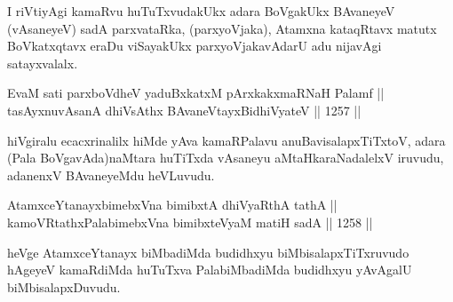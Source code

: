 \begin{artha}
I riVtiyAgi kamaRvu huTuTxvudakUkx adara BoVgakUkx BAvaneyeV (vAsaneyeV) sadA parxvataRka, (parxyoVjaka), Atamxna kataqRtavx matutx BoVkatxqtavx eraDu viSayakUkx parxyoVjakavAdarU adu nijavAgi satayxvalalx.
\end{artha}


\begin{shl}
EvaM sati parxboVdheV yaduBxkatxM pArxkakxmaRNaH Palamf || \\
tasAyxnuvAsanA dhiVsAthx BAvaneVtayxBidhiVyateV \hfill || 1257 ||  
\end{shl}

\begin{artha}
hiVgiralu ecacxrinalilx hiMde yAva kamaRPalavu anuBavisalapxTiTxtoV, adara (Pala BoVgavAda)naMtara huTiTxda vAsaneyu aMtaHkaraNadalelxV iruvudu, adanenxV BAvaneyeMdu heVLuvudu.
\end{artha}


\begin{shl}
AtamxceYtanayxbimebxVna bimibxtA dhiVyaRthA tathA || \\
kamoVRtathxPalabimebxVna bimibxteVyaM matiH sadA \hfill || 1258 ||  
\end{shl}

\begin{artha}
heVge AtamxceYtanayx biMbadiMda budidhxyu biMbisalapxTiTxruvudo hAgeyeV kamaRdiMda huTuTxva PalabiMbadiMda budidhxyu yAvAgalU biMbisalapxDuvudu.
\end{artha}
